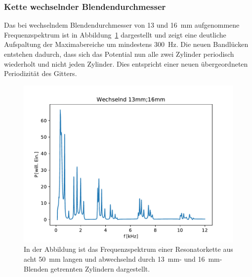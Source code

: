         \subsubsection*{Kette wechselnder Blendendurchmesser}
            Das bei wechselndem Blendendurchmesser von 13 und \SI{16}{\milli\metre} aufgenommene Frequenzspektrum ist in Abbildung~\ref{fig:1dim_8_Zylinder_blendewechselnd_13_16} dargestellt und zeigt eine 
            deutliche Aufspaltung der Maximabereiche um mindestens \SI{300}{\hertz}. Die neuen Bandlücken entstehen dadurch, dass sich das Potential nun alle zwei Zylinder periodisch wiederholt und nicht jeden 
            Zylinder. Dies entspricht einer neuen übergeordneten Periodizität des Gitters.  
            \begin{figure}[ht]
                \centering
                \includegraphics[scale=0.5]{./pictures/1dim_8_Zylinder_blendewechselnd_13_16.pdf}
                \caption{In der Abbildung ist das Frequenzspektrum einer Resonatorkette aus acht \SI{50}{\milli\metre} langen und abwechselnd durch \SI{13}{\milli\metre}- und \SI{16}{\milli\metre}-Blenden getrennten Zylindern dargestellt.}
                \label{fig:1dim_8_Zylinder_blendewechselnd_13_16}
            \end{figure}
            
            











































